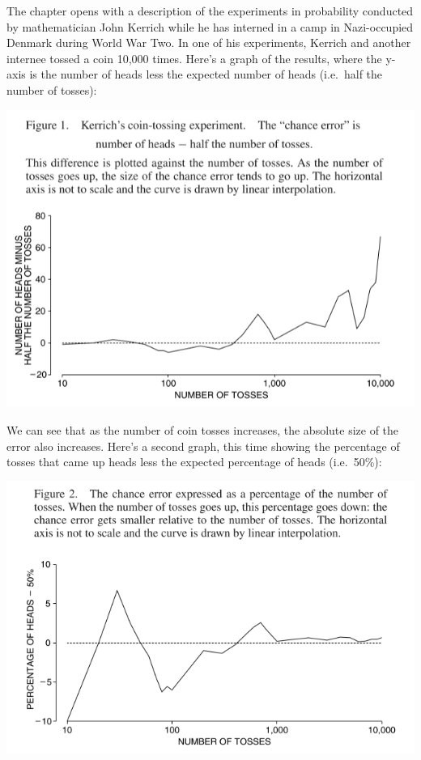 \documentclass[
]{book}
\begin{document}
The chapter opens with a description of the experiments in probability conducted by mathematician John Kerrich while he has interned in a camp in Nazi-occupied Denmark during World War Two. In one of his experiments, Kerrich and another internee tossed a coin 10,000 times. Here's a graph of the results, where the y-axis is the number of heads less the expected number of heads (i.e.~half the number of tosses):

\includegraphics{images/Ch16Img01.png}

We can see that as the number of coin tosses increases, the absolute size of the error also increases. Here's a second graph, this time showing the percentage of tosses that came up heads less the expected percentage of heads (i.e.~50\%):

\includegraphics{images/Ch16Img02.png}
\end{document}
